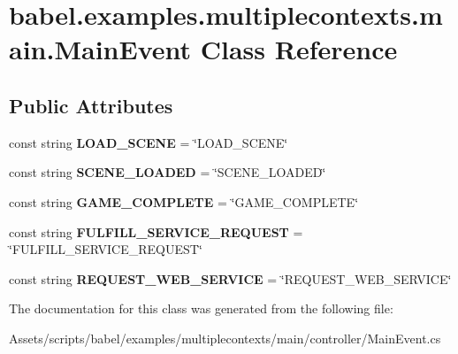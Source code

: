 \hypertarget{classbabel_1_1examples_1_1multiplecontexts_1_1main_1_1_main_event}{\section{babel.\-examples.\-multiplecontexts.\-main.\-Main\-Event Class Reference}
\label{classbabel_1_1examples_1_1multiplecontexts_1_1main_1_1_main_event}
}
\subsection*{Public Attributes}
\begin{DoxyCompactItemize}
\item 
\hypertarget{classbabel_1_1examples_1_1multiplecontexts_1_1main_1_1_main_event_aa81380eaa9a9cbc301b2d495d43912b4}{const string {\bfseries L\-O\-A\-D\-\_\-\-S\-C\-E\-N\-E} = \char`\"{}L\-O\-A\-D\-\_\-\-S\-C\-E\-N\-E\char`\"{}}\label{classbabel_1_1examples_1_1multiplecontexts_1_1main_1_1_main_event_aa81380eaa9a9cbc301b2d495d43912b4}

\item 
\hypertarget{classbabel_1_1examples_1_1multiplecontexts_1_1main_1_1_main_event_a0d701f1f4bd2f34787a2528231e17ead}{const string {\bfseries S\-C\-E\-N\-E\-\_\-\-L\-O\-A\-D\-E\-D} = \char`\"{}S\-C\-E\-N\-E\-\_\-\-L\-O\-A\-D\-E\-D\char`\"{}}\label{classbabel_1_1examples_1_1multiplecontexts_1_1main_1_1_main_event_a0d701f1f4bd2f34787a2528231e17ead}

\item 
\hypertarget{classbabel_1_1examples_1_1multiplecontexts_1_1main_1_1_main_event_a525e1900d09be541aede3b618395484d}{const string {\bfseries G\-A\-M\-E\-\_\-\-C\-O\-M\-P\-L\-E\-T\-E} = \char`\"{}G\-A\-M\-E\-\_\-\-C\-O\-M\-P\-L\-E\-T\-E\char`\"{}}\label{classbabel_1_1examples_1_1multiplecontexts_1_1main_1_1_main_event_a525e1900d09be541aede3b618395484d}

\item 
\hypertarget{classbabel_1_1examples_1_1multiplecontexts_1_1main_1_1_main_event_a478c6ab01b0b17529772073c9b6f847b}{const string {\bfseries F\-U\-L\-F\-I\-L\-L\-\_\-\-S\-E\-R\-V\-I\-C\-E\-\_\-\-R\-E\-Q\-U\-E\-S\-T} = \char`\"{}F\-U\-L\-F\-I\-L\-L\-\_\-\-S\-E\-R\-V\-I\-C\-E\-\_\-\-R\-E\-Q\-U\-E\-S\-T\char`\"{}}\label{classbabel_1_1examples_1_1multiplecontexts_1_1main_1_1_main_event_a478c6ab01b0b17529772073c9b6f847b}

\item 
\hypertarget{classbabel_1_1examples_1_1multiplecontexts_1_1main_1_1_main_event_a38146ea3a597c06463ba31d33c2b4cbb}{const string {\bfseries R\-E\-Q\-U\-E\-S\-T\-\_\-\-W\-E\-B\-\_\-\-S\-E\-R\-V\-I\-C\-E} = \char`\"{}R\-E\-Q\-U\-E\-S\-T\-\_\-\-W\-E\-B\-\_\-\-S\-E\-R\-V\-I\-C\-E\char`\"{}}\label{classbabel_1_1examples_1_1multiplecontexts_1_1main_1_1_main_event_a38146ea3a597c06463ba31d33c2b4cbb}

\end{DoxyCompactItemize}


The documentation for this class was generated from the following file\-:\begin{DoxyCompactItemize}
\item 
Assets/scripts/babel/examples/multiplecontexts/main/controller/Main\-Event.\-cs\end{DoxyCompactItemize}

